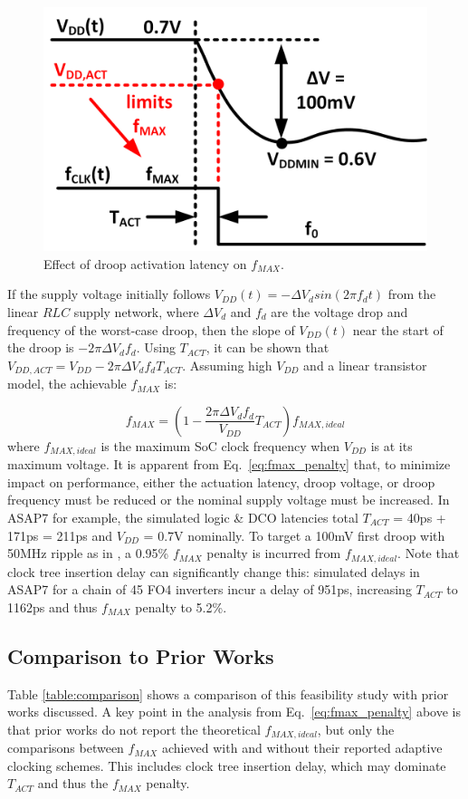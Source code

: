\documentclass[twoside,9pt,journal,letterpage]{IEEEtran}
\begin{document}
\vspace{-7pt}
\begin{figure}[h]
	\centering
	\includegraphics[width=0.6\columnwidth]{fig_drooplatency}
	\caption{Effect of droop activation latency on $f_{MAX}$.}
	\label{fig:drooplatency}
\end{figure}

If the supply voltage initially follows $V_{DD}(t) = -\Delta V_{d}sin(2\pi f_{d}t)$ from the linear $RLC$ supply network, where $\Delta V_{d}$ and $f_{d}$ are the voltage drop and frequency of the worst-case droop, then the slope of $V_{DD}(t)$ near the start of the droop is $-2\pi \Delta V_{d}f_{d}$. Using $T_{ACT}$, it can be shown that $V_{DD,ACT} = V_{DD}-2\pi \Delta V_{d}f_{d}T_{ACT}$. Assuming high $V_{DD}$ and a linear transistor model, the achievable $f_{MAX}$ is:

\begin{equation}
\label{eq:fmax_penalty}
f_{MAX} = (1 - \frac{2\pi\Delta V_{d}f_{d}}{V_{DD}}T_{ACT})f_{MAX,ideal}
\end{equation} 
where $f_{MAX,ideal}$ is the maximum SoC clock frequency when $V_{DD}$ is at its maximum voltage. It is apparent from Eq.\ \ref{eq:fmax_penalty} that, to minimize impact on performance, either the actuation latency, droop voltage, or droop frequency must be reduced or the nominal supply voltage must be increased. In ASAP7 for example, the simulated logic \& DCO latencies total $T_{ACT}$ = 40ps + 171ps = 211ps and $V_{DD}$ = 0.7V nominally. To target a 100mV first droop with 50MHz ripple as in \cite{hashimoto2018}, a 0.95\% $f_{MAX}$ penalty is incurred from $f_{MAX,ideal}$. Note that clock tree insertion delay can significantly change this: simulated delays in ASAP7 for a chain of 45 FO4 inverters incur a delay of 951ps, increasing $T_{ACT}$ to 1162ps and thus $f_{MAX}$ penalty to 5.2\%.

\vspace{-5pt}
\subsection{Comparison to Prior Works}
\label{sec:comp-priors}
Table \ref{table:comparison} shows a comparison of this feasibility study with prior works discussed. A key point in the analysis from Eq.\ \ref{eq:fmax_penalty} above is that prior works do not report the theoretical $f_{MAX,ideal}$, but only the comparisons between $f_{MAX}$ achieved with and without their reported adaptive clocking schemes. This includes clock tree insertion delay, which may dominate $T_{ACT}$ and thus the $f_{MAX}$ penalty.
\end{document}
